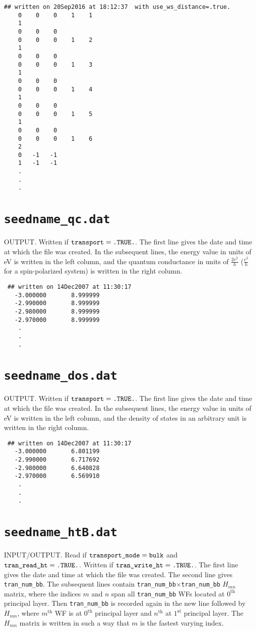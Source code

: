\begin{verbatim}
## written on 20Sep2016 at 18:12:37  with use_ws_distance=.true.
    0    0    0    1    1
    1
    0    0    0
    0    0    0    1    2
    1
    0    0    0
    0    0    0    1    3
    1
    0    0    0
    0    0    0    1    4
    1
    0    0    0
    0    0    0    1    5
    1
    0    0    0
    0    0    0    1    6
    2
    0   -1   -1
    1   -1   -1
    .
    .
    .  
\end{verbatim}

\section{{\tt seedname\_qc.dat}}
OUTPUT. Written if $\verb#transport#=\verb#.TRUE.#$.
The first line gives the date and
time at which the file was created. 
In the subsequent lines, the energy value
in units of eV is written in the left column,
and the quantum conductance in units of 
$\frac{2e^2}{h}$ ($\frac{e^2}{h}$
for a spin-polarized system)
is written in the right column.

\begin{verbatim}
 ## written on 14Dec2007 at 11:30:17
   -3.000000       8.999999
   -2.990000       8.999999
   -2.980000       8.999999
   -2.970000       8.999999
    .
    .
    .
\end{verbatim}

\section{{\tt seedname\_dos.dat}}
OUTPUT. Written if $\verb#transport#=\verb#.TRUE.#$.
The first line gives the date and
time at which the file was created. 
In the subsequent lines, the energy value
in units of eV is written in the left column,
and the density of states in an arbitrary unit
is written in the right column.
 
\begin{verbatim}
 ## written on 14Dec2007 at 11:30:17
   -3.000000       6.801199
   -2.990000       6.717692
   -2.980000       6.640828
   -2.970000       6.569910
    .
    .
    .
\end{verbatim}


\section{{\tt seedname\_htB.dat}}

INPUT/OUTPUT. 
Read if 
$\verb#transport_mode#=\verb#bulk#$
and $\verb#tran_read_ht#=\verb#.TRUE.#$.
Written if $\verb#tran_write_ht#=\verb#.TRUE.#$. 
The first line gives the date and
time at which the file was created. 
The second line gives \verb#tran_num_bb#.
The subsequent lines contain 
\verb#tran_num_bb#$\times$\verb#tran_num_bb#
$H_{mn}$ matrix, where the indices
$m$ and $n$ span all \verb#tran_num_bb# WFs
located at $0^{\mathrm{th}}$ principal layer.
Then \verb#tran_num_bb# is recorded again in the new line 
followed by $H_{mn}$, where
$m^{\mathrm{th}}$ WF is 
at $0^{\mathrm{th}}$ principal layer
and $n^{\mathrm{th}}$ at $1^{\mathrm{st}}$ principal layer.
The $H_{mn}$ matrix is written in such a way that
$m$ is the fastest varying index.

